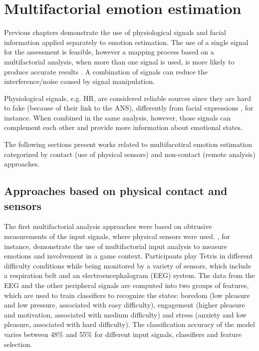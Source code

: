 \chapter{Multifactorial emotion estimation}
\label{ch:literature-multifactorial}

Previous chapters demonstrate the use of physiological signals and facial information applied separately to emotion estimation. The use of a single signal for the assessment is feasible, however a mapping process based on a multifactorial analysis, when more than one signal is used, is more likely to produce accurate results \parencite{kukolja2014comparative}. A combination of signals can reduce the interference/noise caused by signal manipulation.

Physiological signals, e.g. HR, are considered reliable sources since they are hard to fake (because of their link to the ANS), differently from facial expressions \parencite{Landowska}, for instance. When combined in the same analysis, however, those signals can complement each other and provide more information about emotional states.

The following sections present works related to multifacotiral emotion estimation categorized by contact (use of physical sensors) and non-contact (remote analysis) approaches.   

\section{Approaches based on physical contact and sensors}

The first multifactorial analysis approaches were based on obtrusive measurements of the input signals, where physical sensors were used. \textcite{Chanel_2011}, for instance, demonstrate the use of multifactorial input analysis to measure emotions and involvement in a game context. Participants play Tetris in different difficulty conditions while being monitored by a variety of sensors, which include a respiration belt and an electroencephalogram (EEG) system. The data from the EEG and the other peripheral signals are computed into two groups of features, which are used to train classifiers to recognize the states: boredom (low pleasure and low pressure, associated with easy difficulty), engagement (higher pleasure and motivation, associated with medium difficulty) and stress (anxiety and low pleasure, associated with hard difficulty). The classification accuracy of the model varies between 48\% and 55\% for different input signals, classifiers and feature selection.

